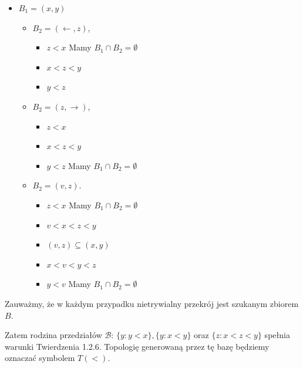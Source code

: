 \begin{eg}[1.2.8 $T(<)$]
\begin{itemize}
\begin{itemize}
		\end{itemize}
	\item $B_1 = \left( x, y  \right) $
		\begin{itemize}
			\item $B_2 = \left( \leftarrow , z \right) $,
				\begin{itemize}
					\item $z<x$ Mamy $ B_1\cap B_2 =\emptyset$
					\item $x<z<y$
					\item $y<z$
				\end{itemize}
			\item $B_2 = \left( z, \rightarrow  \right) $,
				\begin{itemize}
					\item $z<x$
					\item $x<z<y$
					\item $y<z$ Mamy $ B_1\cap B_2 =\emptyset$
				\end{itemize}
			\item $B_2 = \left( v,z \right) $.
				\begin{itemize}
					\item $z<x$ Mamy $ B_1\cap B_2 =\emptyset$
					\item $v<x<z<y$
					\item $\left( v,z \right) \subseteq \left( x,y \right) $ 
					\item $x<v<y<z$
					\item $y<v$ Mamy $ B_1\cap B_2 =\emptyset$
				\end{itemize}
		\end{itemize}
\end{itemize}
Zauważmy, że w każdym przypadku nietrywialny przekrój jest szukanym zbiorem $B$.

\noindent Zatem rodzina przedziałów $\mathcal{B}$: $\{y: y <x\}, \{y: x < y\}$ oraz $\{z: x<z<y\} $ spełnia warunki Twierdzenia 1.2.6. Topologię generowaną przez tę bazę będziemy oznaczać symbolem $T\left( < \right) $.
\end{eg}
